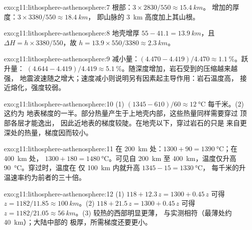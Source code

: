 \begin{solution}{exo:g11:lithosphere-asthenosphere:7}
根部：$3 \times 2830/550 \approx \qty{15.4}{km}$。
增加的厚度：$3 \times 3380/550 \approx \qty{18.4}{km}$，
即山脉的 \qty{3}{km} 高度加上其山根。
\end{solution}

\begin{solution}{exo:g11:lithosphere-asthenosphere:8}
地壳增厚 $55 - 41.1 = \qty{13.9}{km}$，且 $\Delta H = h
\times 3380/550$，故 $h = 13.9 \times 550/3380 \approx \qty{2.3}{km}$。
\end{solution}

\begin{solution}{exo:g11:lithosphere-asthenosphere:9}
减小量：$(4.470 - 4.419)/4.470 \approx \qty{1.1}{\percent}$。跃升量：
$(4.644 - 4.419)/4.419 \approx \qty{5.1}{\percent}$。随深度增加，岩石受到的压缩越来越强，
地震波速随之增大；速度减小则说明另有因素起主导作用：岩石温度高，
接近熔化，强度较弱。
\end{solution}

\begin{solution}{exo:g11:lithosphere-asthenosphere:10}
(1) $(1345 - 610)/60 \approx \qty{12}{\celsius}$ 每千米。(2) 这约为
地表梯度的一半。部分热量产生于上地壳内部，这些热量同样需要穿过
顶部各层才能逸出，
因此近地表的梯度较陡。在地壳以下，穿过岩石的只是
来自更深处的热量，梯度因而较小。
\end{solution}

\begin{solution}{exo:g11:lithosphere-asthenosphere:11}
在 \qty{200}{km} 处：$1300 + 90 = \qty{1390}{\celsius}$；在 \qty{400}{km} 处，
$1300 + 180 = \qty{1480}{\celsius}$。可见自 \qty{200}{km} 至
\qty{400}{km}，温度仅升高 \qty{90}{\celsius}。穿过时，温度在
仅 \qty{100}{km} 内就升高 $1345 - 15 = \qty{1330}{\celsius}$，
每千米的升温速率约为前者的三十倍。
\end{solution}

\begin{solution}{exo:g11:lithosphere-asthenosphere:12}
(1) $118 + 12.3\,z = 1300 + 0.45\,z$ 可得 $z = 1182/11.85 \approx
\qty{100}{km}$。(2) $118 + 21.5\,z = 1300 + 0.45\,z$ 可得 $z = 1182/21.05
\approx \qty{56}{km}$。(3) 较热的西部明显更薄，
与实测相符（最薄处约 \qty{40}{km}）；大陆中部的
极厚，所需梯度还要更小。
\end{solution}

